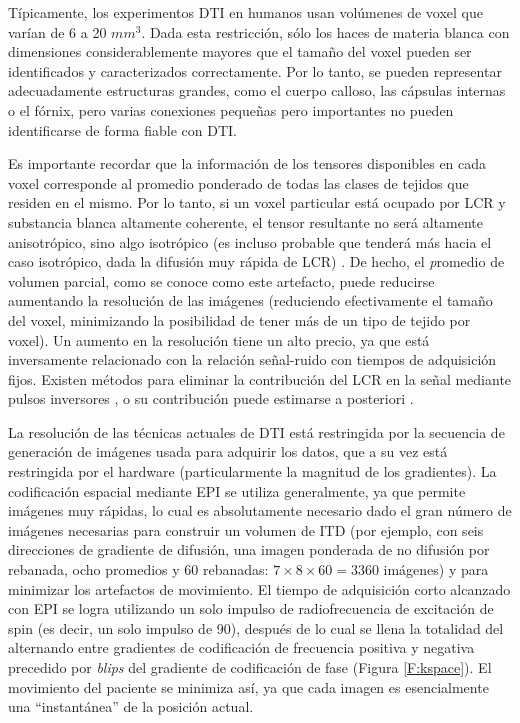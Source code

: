 Típicamente, los experimentos DTI en humanos usan volúmenes de voxel que varían de 6 a 20 $mm^{3}$. Dada esta restricción, sólo los haces de materia blanca con dimensiones considerablemente mayores que el tamaño del voxel pueden ser identificados y caracterizados correctamente. Por lo tanto, se pueden representar adecuadamente estructuras grandes, como el cuerpo calloso, las cápsulas internas o el fórnix, pero varias conexiones pequeñas pero importantes no pueden identificarse de forma fiable con DTI.

Es importante recordar que la información de los tensores disponibles en cada voxel corresponde al promedio ponderado de todas las clases de tejidos que residen en el mismo. Por lo tanto, si un voxel particular está ocupado por LCR y substancia blanca altamente coherente, el tensor resultante no será altamente anisotrópico, sino algo isotrópico (es incluso probable que tenderá más hacia el caso isotrópico, dada la difusión muy rápida de LCR) \cite{Concha_2005}. De hecho, el {\emph promedio de volumen parcial}, como se conoce como este artefacto, puede reducirse aumentando la resolución de las imágenes (reduciendo efectivamente el tamaño del voxel, minimizando la posibilidad de tener más de un tipo de tejido por voxel). Un aumento en la resolución tiene un alto precio, ya que está inversamente relacionado con la relación señal-ruido con tiempos de adquisición fijos. Existen métodos para eliminar la contribución del LCR en la señal mediante pulsos inversores \cite{Concha_2005}, o su contribución puede estimarse a posteriori \cite{pasternak2009free}.

La resolución de las técnicas actuales de DTI está restringida por la secuencia de generación de imágenes usada para adquirir los datos, que a su vez está restringida por el hardware (particularmente la magnitud de los gradientes). La codificación espacial mediante EPI se utiliza generalmente, ya que permite imágenes muy rápidas, lo cual es absolutamente necesario dado el gran número de imágenes necesarias para construir un volumen de ITD (por ejemplo, con seis direcciones de gradiente de difusión, una imagen ponderada de no difusión por rebanada, ocho promedios y 60 rebanadas: $7×8×60 = 3360$ imágenes) y para minimizar los artefactos de movimiento. El tiempo de adquisición corto alcanzado con EPI se logra utilizando un solo impulso de radiofrecuencia de excitación de spin (es decir, un solo impulso de 90\textdegree{}), después de lo cual se llena la totalidad del \espaciok alternando entre gradientes de codificación de frecuencia positiva y negativa precedido por \textit{blips} del gradiente de codificación de fase (Figura \ref{F:kspace}). El movimiento del paciente se minimiza así, ya que cada imagen es esencialmente una ``instantánea'' de la posición actual.

